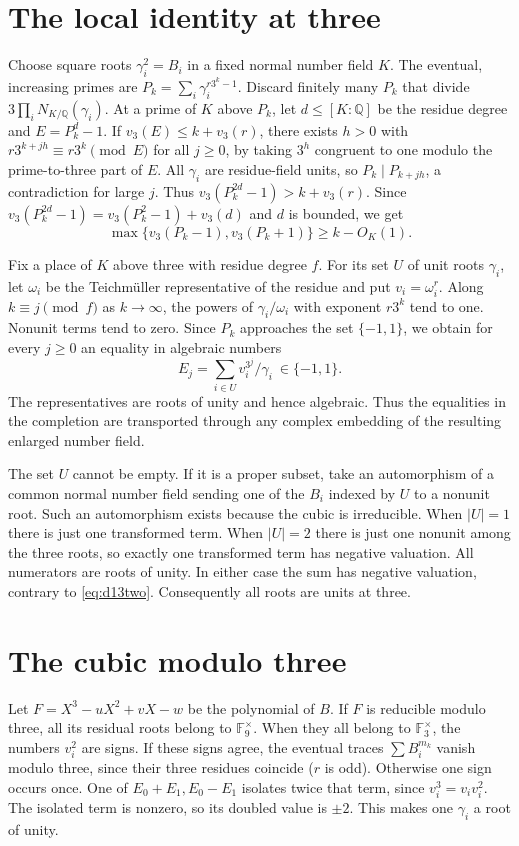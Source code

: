 \documentclass[11pt]{article}
\begin{document}
\section{The local identity at three}
Choose square roots $\gamma_i^2=B_i$ in a fixed normal number
field $K$. The eventual, increasing primes are
$P_k=\sum_i\gamma_i^{r3^k-1}$. Discard finitely many $P_k$ that
divide $3\prod_i N_{K/\mathbb Q}(\gamma_i)$. At a prime of
$K$ above $P_k$, let $d\le[K:\mathbb Q]$ be the residue degree and
$E=P_k^d-1$. If $v_3(E)\le k+v_3(r)$, there exists $h>0$ with
$r3^{k+jh}\equiv r3^k\pmod E$ for all $j\ge0$, by taking $3^h$
congruent to one modulo the prime-to-three part of $E$. All
$\gamma_i$ are residue-field units, so $P_k\mid P_{k+jh}$, a
contradiction for large $j$. Thus $v_3(P_k^{2d}-1)>k+v_3(r)$. Since
$v_3(P_k^{2d}-1)=v_3(P_k^2-1)+v_3(d)$ and $d$ is bounded, we get
\[
 \max\{v_3(P_k-1),v_3(P_k+1)\}\ge k-O_K(1).
\]

Fix a place of $K$ above three with residue degree $f$. For its set
$U$ of unit roots $\gamma_i$, let $\omega_i$ be the Teichm\"uller
representative of the residue and put $v_i=\omega_i^r$. Along
$k\equiv j\pmod f$ as $k\to\infty$, the powers of
$\gamma_i/\omega_i$ with exponent $r3^k$ tend to one. Nonunit
terms tend to zero. Since $P_k$ approaches the set $\{-1,1\}$, we obtain
for every $j\ge0$ an equality in algebraic numbers
\begin{equation}\label{eq:d13two}
  E_j=\sum_{i\in U} v_i^{3^j}/\gamma_i\ \in\{-1,1\}.
\end{equation}
The representatives are roots of unity and hence algebraic. Thus the
equalities in the completion are transported through any complex
embedding of the resulting enlarged number field.


The set $U$ cannot be empty. If it is a proper subset, take an
automorphism of a common normal number field sending one of the
$B_i$ indexed by $U$ to a nonunit root. Such an automorphism exists
because the cubic is irreducible. When $|U|=1$ there is just one
transformed term. When $|U|=2$ there is just one nonunit among the
three roots, so exactly one transformed term has negative valuation.
All numerators are roots of unity. In either case the sum has negative
valuation, contrary to \eqref{eq:d13two}. Consequently all roots are
units at three.
\section{The cubic modulo three}
Let $F=X^3-uX^2+vX-w$ be the polynomial of $B$. If $F$ is
reducible modulo three, all its residual roots belong to
$\mathbb F_9^\times$. When they all belong to $\mathbb F_3^\times$,
the numbers $v_i^2$ are signs. If these signs agree, the eventual
traces $\sum B_i^{m_k}$ vanish modulo three, since their three
residues coincide ($r$ is odd). Otherwise one sign occurs once.
One of $E_0+E_1,E_0-E_1$ isolates twice that term, since
$v_i^3=v_i v_i^2$. The isolated term is nonzero, so its doubled value is $\pm2$. This makes one $\gamma_i$ a root of unity.
\end{document}
